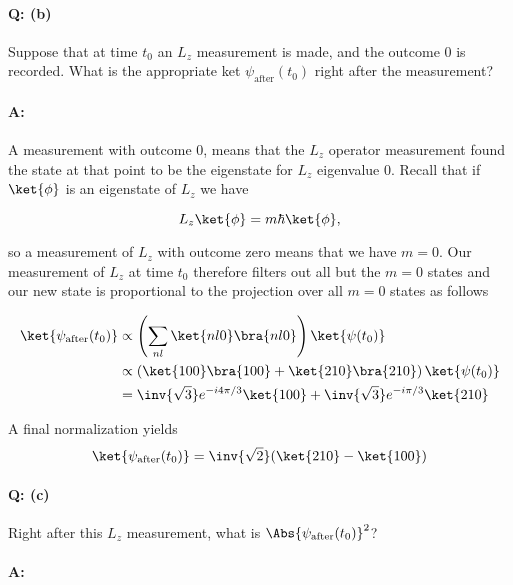 \paragraph{Q: (b)}

Suppose that at time $t_0$ an $L_z$ measurement is made, and the outcome 0 is recorded.  What is the appropriate ket $\psi_{\text{after}}(t_0)$ right after the measurement?

\paragraph{A:}

A measurement with outcome 0, means that the $L_z$ operator measurement found the state at that point to be the eigenstate for $L_z$ eigenvalue 0.  Recall that  if $\ket{\phi}$ is an eigenstate of $L_z$ we have

\begin{equation}\label{eqn:qmIexamPractice2007Dec:4:200}
L_z \ket{\phi} = m \hbar \ket{\phi},
\end{equation}

so a measurement of $L_z$ with outcome zero means that we have $m=0$.  Our measurement of $L_z$ at time $t_0$ therefore filters out all but the $m=0$ states and our new state is proportional to the projection over all $m=0$ states as follows

\begin{align*}
\ket{\psi_{\text{after}}(t_0)}
&\propto \left( \sum_{n l} \ket{n l 0}\bra{n l 0} \right) \ket{\psi(t_0)}  \\
&\propto \left( 
\ket{1 0 0}\bra{1 0 0} 
+\ket{2 1 0}\bra{2 1 0} 
\right) \ket{\psi(t_0)}  \\
&= 
\inv{\sqrt{3}} e^{-i 4 \pi / 3} \ket{100}
+\inv{\sqrt{3}} e^{- i \pi / 3 } \ket{210} 
\end{align*}

A final normalization yields
\begin{equation}\label{eqn:qmIexamPractice2007Dec:4:210}
\ket{\psi_{\text{after}}(t_0)}
= \inv{\sqrt{2}} (\ket{210} - \ket{100})
\end{equation}

\paragraph{Q: (c)}

Right after this $L_z$ measurement, what is $\Abs{\psi_{\text{after}}(t_0)}^2$?

\paragraph{A:}

